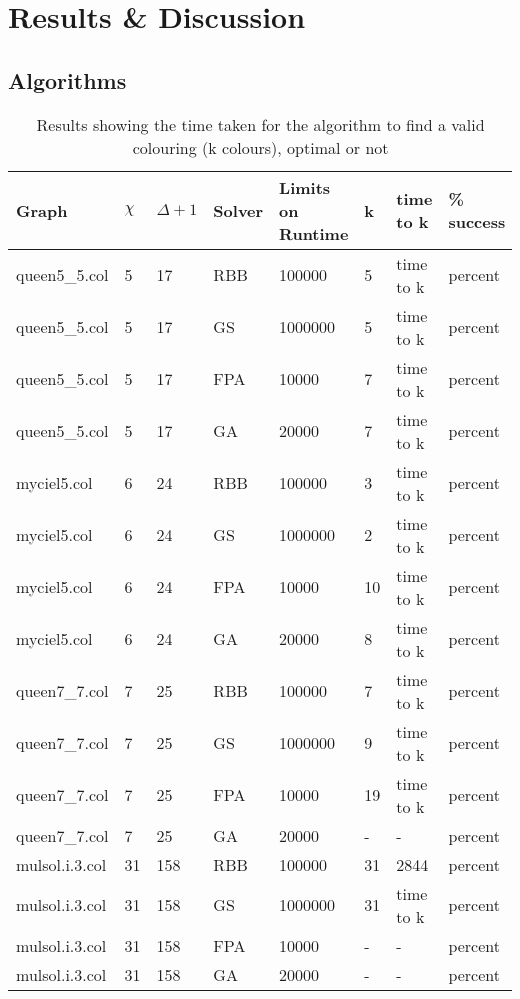 \chapter{Results \& Discussion}

\section{Algorithms}



\begin{table}[H]
\centering
\begin{tabular}{l l l l l l l l}
\hline
Graph & $\chi$ & $\Delta + 1$ & Solver & Limits on Runtime & k & time to k & \% success\\ \hline

queen5\_5.col & 5 & 17 & RBB & 100000 & 5 & time to k & percent\\
queen5\_5.col & 5 & 17 & GS & 1000000 & 5 & time to k & percent\\
queen5\_5.col & 5 & 17 & FPA & 10000 & 7 & time to k & percent\\
queen5\_5.col & 5 & 17 & GA & 20000 & 7 & time to k & percent\\

myciel5.col & 6 & 24 & RBB & 100000 & 3 & time to k & percent\\
myciel5.col & 6 & 24 & GS & 1000000 & 2 & time to k & percent\\
myciel5.col & 6 & 24 & FPA & 10000 & 10 & time to k & percent\\
myciel5.col & 6 & 24 & GA & 20000 & 8 & time to k & percent\\

queen7\_7.col & 7 & 25 & RBB & 100000 & 7 & time to k & percent\\
queen7\_7.col & 7 & 25 & GS & 1000000 & 9 & time to k & percent\\
queen7\_7.col & 7 & 25 & FPA & 10000 & 19 & time to k & percent\\
queen7\_7.col & 7 & 25 & GA & 20000 & - & - & percent\\

mulsol.i.3.col & 31 & 158 & RBB & 100000 & 31 & 2844 & percent\\
mulsol.i.3.col & 31 & 158 & GS & 1000000 & 31 & time to k & percent\\
mulsol.i.3.col & 31 & 158 & FPA & 10000 & - & - & percent\\
mulsol.i.3.col & 31 & 158 & GA & 20000 & - & - & percent\\

\hline
\end{tabular}
\caption{Results showing the time taken for the algorithm to find a valid colouring (k colours), optimal or not}
\label{res:timeToK}
\end{table}

